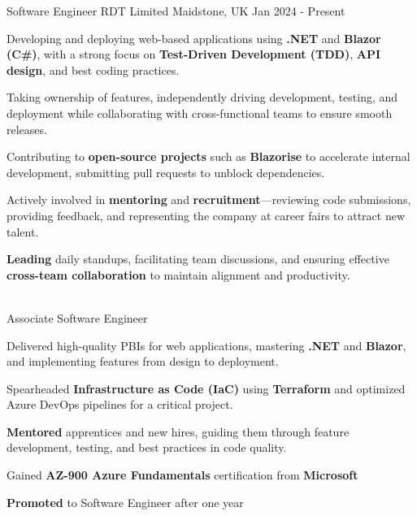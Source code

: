 \begin{cventries}
    \cventry
    {Software Engineer} %
    {RDT Limited} %
    {Maidstone, UK} %
    {Jan 2024 - Present} %
    {
      \begin{cvitems}
        \item {Developing and deploying web-based applications using \textbf{.NET} and \textbf{Blazor} \textbf{(C\#)}, with a strong focus on \textbf{Test-Driven Development (TDD)}, \textbf{API design}, and best coding practices.}
        \item {Taking ownership of features, independently driving development, testing, and deployment while collaborating with cross-functional teams to ensure smooth releases.}
        \item {Contributing to \textbf{open-source projects} such as \textbf{Blazorise} to accelerate internal development, submitting pull requests to unblock dependencies.}
        \item {Actively involved in \textbf{mentoring} and \textbf{recruitment}—reviewing code submissions, providing feedback, and representing the company at career fairs to attract new talent.}
        \item {\textbf{Leading} daily standups, facilitating team discussions, and ensuring effective \textbf{cross-team collaboration} to maintain alignment and productivity.}
      \end{cvitems}
    }
    \\[15pt]
    \cventry
    {Associate Software Engineer} %
    {} %
    {} %
    {} %
    {
      \begin{cvitems}
        \item {Delivered high-quality PBIs for web applications, mastering \textbf{.NET} and \textbf{Blazor}, and implementing features from design to deployment.}
        \item {Spearheaded \textbf{Infrastructure as Code (IaC)} using \textbf{Terraform} and optimized Azure DevOps pipelines for a critical project.}
        \item {\textbf{Mentored} apprentices and new hires, guiding them through feature development, testing, and best practices in code quality.}
        \item {Gained \textbf{AZ-900 Azure Fundamentals} certification from \textbf{Microsoft}}
        \item {\textbf{Promoted} to Software Engineer after one year}
      \end{cvitems}
}
\end{cventries}
